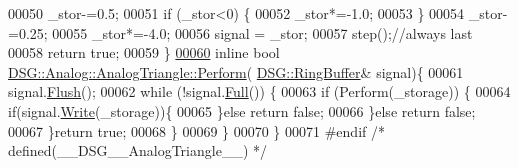 \begin{DoxyCode}
00050             \_stor-=0.5;
00051             \textcolor{keywordflow}{if} (\_stor<0) \{
00052                 \_stor*=-1.0;
00053             \}
00054             \_stor-=0.25;
00055             \_stor*=-4.0;
00056             signal = \_stor;
00057             step();\textcolor{comment}{//always last}
00058             \textcolor{keywordflow}{return} \textcolor{keyword}{true};
00059         \}
\hypertarget{_analog_triangle_8h_source_l00060}{}\hyperlink{class_d_s_g_1_1_analog_1_1_analog_triangle_a568c994e0f83f6a01d813357259a8f37}{00060}         \textcolor{keyword}{inline} \textcolor{keywordtype}{bool} \hyperlink{class_d_s_g_1_1_analog_1_1_analog_triangle_a9b2484f3eb4c4ad545cb88b8833be124}{DSG::Analog::AnalogTriangle::Perform}(
      \hyperlink{class_d_s_g_1_1_ring_buffer}{DSG::RingBuffer}& signal)\{
00061             signal.\hyperlink{class_d_s_g_1_1_ring_buffer_ab23c8003d2857809a816068eeb209d60}{Flush}();
00062             \textcolor{keywordflow}{while} (!signal.\hyperlink{class_d_s_g_1_1_ring_buffer_a53ddb04ffcbb5470a8d2b0a3c65b70cb}{Full}()) \{
00063                 \textcolor{keywordflow}{if} (Perform(\_storage)) \{
00064                     \textcolor{keywordflow}{if}(signal.\hyperlink{class_d_s_g_1_1_ring_buffer_aa5dd2caa0a270173251faee40a43d692}{Write}(\_storage))\{
00065                     \}\textcolor{keywordflow}{else} \textcolor{keywordflow}{return} \textcolor{keyword}{false};
00066                 \}\textcolor{keywordflow}{else} \textcolor{keywordflow}{return} \textcolor{keyword}{false};
00067             \}\textcolor{keywordflow}{return} \textcolor{keyword}{true};
00068         \}
00069     \}
00070 \} 
00071 \textcolor{preprocessor}{#endif }\textcolor{comment}{/* defined(\_\_DSG\_\_AnalogTriangle\_\_) */}\textcolor{preprocessor}{}
\end{DoxyCode}
